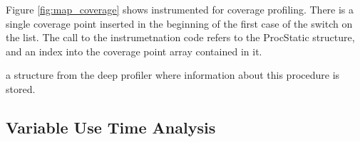
Figure \ref{fig:map_coverage} shows  instrumented for coverage
profiling.
There is a single coverage point inserted in the beginning of the first
case of the switch on the list.
The call to the instrumetnation code 
refers to the ProcStatic structure,
and an index into the coverage point array contained in it.

a structure from the deep profiler where information about this procedure is
stored.




\subsection{Variable Use Time Analysis}
\label{sec:var_use_analysis}

